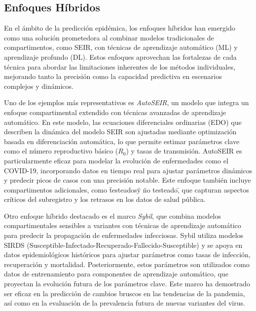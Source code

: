\subsection{Enfoques Híbridos}\label{subsection:hybrid-approaches}

En el ámbito de la predicción epidémica, los enfoques híbridos han emergido como una solución prometedora al combinar modelos tradicionales de compartimentos, como SEIR, con técnicas de aprendizaje automático (ML) y aprendizaje profundo (DL). Estos enfoques aprovechan las fortalezas de cada técnica para abordar las limitaciones inherentes de los métodos individuales, mejorando tanto la precisión como la capacidad predictiva en escenarios complejos y dinámicos\parencite{Rodriguez2022DataCentric, Baccega2024Sybil}.

Uno de los ejemplos más representativos es \textit{AutoSEIR}, un modelo que integra un enfoque compartimental extendido con técnicas avanzadas de aprendizaje automático. En este modelo, las ecuaciones diferenciales ordinarias (EDO) que describen la dinámica del modelo SEIR son ajustadas mediante optimización basada en diferenciación automática, lo que permite estimar parámetros clave como el número reproductivo básico (\(R_0\)) y tasas de transmisión\parencite{Rizzo2020AutoSEIR}. AutoSEIR es particularmente eficaz para modelar la evolución de enfermedades como el COVID-19, incorporando datos en tiempo real para ajustar parámetros dinámicos y predecir picos de casos con una precisión notable\parencite{Baccega2024Sybil}. Este enfoque también incluye compartimentos adicionales, como \"testeados\" y \"no testeado\", que capturan aspectos críticos del subregistro y los retrasos en los datos de salud pública\parencite{Stergiou2022MachineLearning}.

Otro enfoque híbrido destacado es el marco \textit{Sybil}, que combina modelos compartimentales sensibles a variantes con técnicas de aprendizaje automático para predecir la propagación de enfermedades infecciosas. Sybil utiliza modelos SIRDS (Susceptible-Infectado-Recuperado-Fallecido-Susceptible) y se apoya en datos epidemiológicos históricos para ajustar parámetros como tasas de infección, recuperación y mortalidad. Posteriormente, estos parámetros son utilizados como datos de entrenamiento para componentes de aprendizaje automático, que proyectan la evolución futura de los parámetros clave\parencite{Baccega2024Sybil}. Este marco ha demostrado ser eficaz en la predicción de cambios bruscos en las tendencias de la pandemia, así como en la evaluación de la prevalencia futura de nuevas variantes del virus\parencite{Nguyen2023NZSTGNN, Baccega2024Sybil}.

